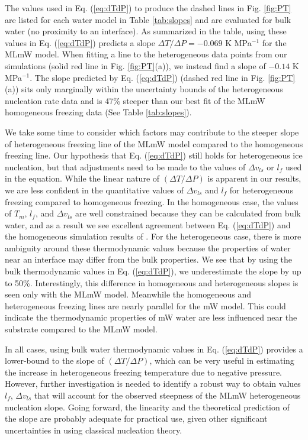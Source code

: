 \documentclass[journal abbreviation, manuscript]{copernicus}
\begin{document}
The values used in Eq. (\ref{eq:dTdP}) to produce the dashed lines in Fig. \ref{fig:PT} are listed for each water model in Table \ref{tab:slopes} and are evaluated for bulk water (no proximity to an interface). As summarized in the table, using these values in Eq. (\ref{eq:dTdP}) predicts a slope $\Delta T/\Delta P = -0.069$ K MPa$^{-1}$ for the MLmW model. When fitting a line to the heterogeneous data points from our simulations (solid red line in Fig. \ref{fig:PT}(a)), we instead find a slope of $-0.14$ K MPa$^{-1}$. The slope predicted by Eq. (\ref{eq:dTdP}) (dashed red line in Fig. \ref{fig:PT}(a)) sits only marginally within the uncertainty bounds of the heterogeneous nucleation rate data and is 47\% steeper than our best fit of the MLmW homogeneous freezing data (See Table \ref{tab:slopes}).

We take some time to consider which factors may contribute to the steeper slope of heterogeneous freezing line of the MLmW model compared to the homogeneous freezing line. Our hypothesis that Eq. (\ref{eq:dTdP}) still holds for heterogeneous ice nucleation, but that adjustments need to be made to the values of $\Delta v_{ls}$ or $l_f$ used in the equation. While the linear nature of $(\Delta T/\Delta P)$ is apparent in our results, we are less confident in the quantitative values of $\Delta v_{ls}$ and $l_f$ for heterogeneous freezing compared to homogeneous freezing. In the homogeneous case, the values of $T_m$, $l_f$, and $\Delta v_{ls}$ are well constrained because they can be calculated from bulk water, and as a result we see excellent agreement between Eq. (\ref{eq:dTdP}) and the homogeneous simulation results of \citet{rosky2022}. For the heterogeneous case, there is more ambiguity around these thermodynamic values because the properties of water near an interface may differ from the bulk properties. We see that by using the bulk thermodynamic values in Eq. (\ref{eq:dTdP}), we underestimate the slope by up to 50\%. Interestingly, this difference in homogeneous and heterogeneous slopes is seen only with the MLmW model. Meanwhile the homogeneous and heterogeneous freezing lines are nearly parallel for the mW model. This could indicate the thermodynamic properties of mW water are less influenced near the substrate compared to the MLmW model. 

In all cases, using bulk water thermodynamic values in Eq. (\ref{eq:dTdP}) provides a lower-bound to the slope of $(\Delta T/\Delta P)$, which can be very useful in estimating the increase in heterogeneous freezing temperature due to negative pressure. However, further investigation is needed to identify a robust way to obtain values $l_f$, $\Delta v_{ls}$ that will account for the observed steepness of the MLmW heterogeneous nucleation slope. Going forward, the linearity and the theoretical prediction of the slope are probably adequate for practical use, given other significant uncertainties in using classical nucleation theory. 
\end{document}
